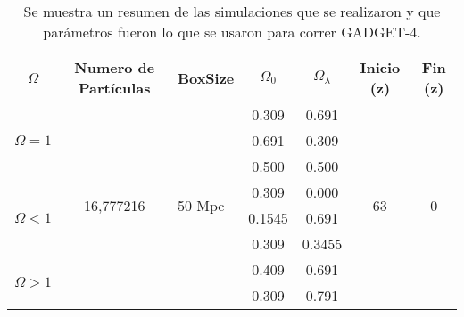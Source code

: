 \begin{table}[H]
    \begin{tabular}{|c|c|l|c|c|c|c|}
    \hline
    $\Omega$                      & Numero de Partículas       & BoxSize                 & $\Omega_0$ & $\Omega_\lambda$ & Inicio (z)          & Fin (z)            \\ \hline
    \multirow{3}{*}{$\Omega = 1$} & \multirow{8}{*}{16,777216} & \multirow{8}{*}{50 Mpc} & 0.309      & 0.691            & \multirow{8}{*}{63} & \multirow{8}{*}{0} \\ \cline{4-5}
                                  &                            &                         & 0.691      & 0.309            &                     &                    \\ \cline{4-5}
                                  &                            &                         & 0.500      & 0.500            &                     &                    \\ \cline{1-1} \cline{4-5}
    \multirow{3}{*}{$\Omega < 1$} &                            &                         & 0.309      & 0.000            &                     &                    \\ \cline{4-5}
                                  &                            &                         & 0.1545     & 0.691            &                     &                    \\ \cline{4-5}
                                  &                            &                         & 0.309      & 0.3455           &                     &                    \\ \cline{1-1} \cline{4-5}
    \multirow{2}{*}{$\Omega > 1$} &                            &                         & 0.409      & 0.691            &                     &                    \\ \cline{4-5}
                                  &                            &                         & 0.309      & 0.791            &                     &                    \\ \hline
    \end{tabular}
    \caption{\footnotesize Se muestra un resumen de las simulaciones que se realizaron y que parámetros fueron lo que se usaron para correr GADGET-4.}
    \label{tab:Resumen_Sim}
    \end{table}
